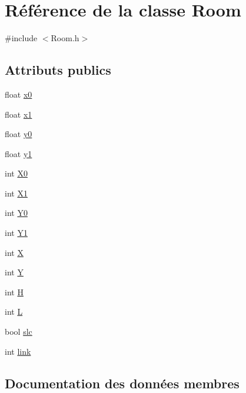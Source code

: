 \hypertarget{classRoom}{}\section{Référence de la classe Room}
\label{classRoom}


{\ttfamily \#include $<$Room.\+h$>$}

\subsection*{Attributs publics}
\begin{DoxyCompactItemize}
\item 
float \hyperlink{classRoom_a8c2c53dfd4ac5f0ef8a8c70eb4fed53f}{x0}
\item 
float \hyperlink{classRoom_a6c2c152badbf40c60007a0549a65816d}{x1}
\item 
float \hyperlink{classRoom_a8f0ab053f8ae8aa19a20886abcee48b1}{y0}
\item 
float \hyperlink{classRoom_a6a15148bbcac2e661cde043513f6ebcd}{y1}
\item 
int \hyperlink{classRoom_ae885f74893479bd7c52683d765a05ec3}{X0}
\item 
int \hyperlink{classRoom_a3dd18ad8ac5a6e3bcecf9cb027608659}{X1}
\item 
int \hyperlink{classRoom_a923a4d2d5a430aad247a9a96cb3b6102}{Y0}
\item 
int \hyperlink{classRoom_a0f689986e4bb0c1074397d4ca32fcd9a}{Y1}
\item 
int \hyperlink{classRoom_a2d0dea3f2da189a0d55a5690458e9666}{X}
\item 
int \hyperlink{classRoom_adc03e19935b35a30dfcbab2140bf8316}{Y}
\item 
int \hyperlink{classRoom_ab77bfb2628c58874d85d55c71670f1c0}{H}
\item 
int \hyperlink{classRoom_ab536200b9342330428d4ec08fa844837}{L}
\item 
bool \hyperlink{classRoom_a6af8720f2f66b2133b209d4c64fba0e1}{slc}
\item 
int \hyperlink{classRoom_adb97bee1bbe5ca5819962704633144c0}{link}
\end{DoxyCompactItemize}


\subsection{Documentation des données membres}
\mbox{\label{classRoom_ab77bfb2628c58874d85d55c71670f1c0}} 
